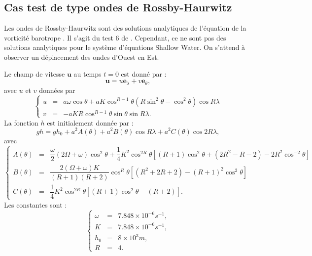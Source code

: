 \subsection{Cas test de type ondes de Rossby-Haurwitz}

Les ondes de Rossby-Haurwitz sont des solutions analytiques de l'équation de la vorticité barotrope \cite{Haurwitz1940, Pedlosky2013}. Il s'agit du test 6 de \cite{Williamson1992}. Cependant, ce ne sont pas des solutions analytiques pour le système d'équations Shallow Water. On s'attend à observer un déplacement des ondes d'Ouest en Est.

Le champ de vitesse $\mathbf{u}$ au temps $t=0$ est donné par :
\begin{equation}
\mathbf{u} = u \mathbf{e}_{\lambda} + v \mathbf{e}_{\theta},
\end{equation}
avec $u$ et $v$ données par
\begin{equation}
\left\lbrace
\begin{array}{rcl}
u & = & a \omega \cos \theta + a K \cos^{R-1} \theta \left( R \sin^2 \theta - \cos^2 \theta \right) \cos R \lambda\\
v & = & - a K R \cos^{R-1} \theta \sin \theta \sin R \lambda.
\end{array}
\right.
\end{equation}
La fonction $h$ est initialement donnée par :
\begin{equation}
gh = gh_0 + a^2 A(\theta) + a^2 B(\theta) \cos R \lambda + a^2 C(\theta) \cos 2 R \lambda,
\end{equation}
avec
\begin{equation}
\left\lbrace
\begin{array}{rcl}
A(\theta) & = & \dfrac{\omega}{2} \left( 2 \Omega + \omega \right) \cos^2 \theta + \dfrac{1}{4} K^2 \cos^{2R} \theta 
\left[ (R+1) \cos^2 \theta+ (2R^2 -R -2) - 2R^2 \cos^{-2} \theta \right]\\
B(\theta) & = & \dfrac{2 (\Omega +\omega) K }{(R+1)(R+2)} \cos^R \theta 
\left[ (R^2 + 2R +2) - (R+1)^2 \cos^2 \theta  \right] \\
C(\theta) & = & \dfrac{1}{4} K^2 \cos^{2R} \theta \left[ (R+1) \cos^2 \theta - (R+2) \right].
\end{array}
\right.
\end{equation}
Les constantes sont :
\begin{equation}
\left\lbrace
\begin{array}{rcl}
\omega & = & 7.848 \times 10^{-6} \si{s^{-1}},\\
K & = & 7.848 \times 10^{-6} \si{s^{-1}},\\
h_0 & = & 8 \times 10^3 \si{m},\\
R & = & 4.
\end{array}
\right.
\end{equation} 


